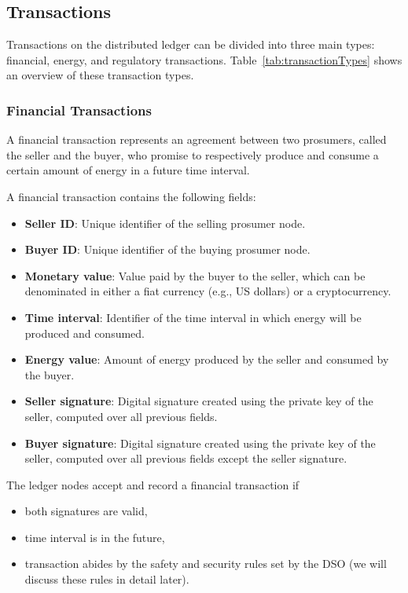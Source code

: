 \documentclass[sigconf]{acmart}
\begin{document}
\subsection{Transactions}

Transactions on the distributed ledger can be divided into three main types: financial, energy, and regulatory transactions.
Table~\ref{tab:transactionTypes} shows an overview of these transaction types.

\subsubsection{Financial Transactions}
A financial transaction represents an agreement between two prosumers, called the seller and the buyer, who promise to respectively produce and consume a certain amount of energy in a future time interval.

A financial transaction contains the following fields:
\begin{itemize}
\item \textbf{Seller ID}: Unique identifier of the selling prosumer node.
\item \textbf{Buyer ID}: Unique identifier of the buying prosumer node.
\item \textbf{Monetary value}: Value paid by the buyer to the seller, which can be denominated in either a fiat currency (e.g., US dollars) or a cryptocurrency.
\item \textbf{Time interval}: Identifier of the time interval in which energy will be produced and consumed.
\item \textbf{Energy value}: Amount of energy produced by the seller and consumed by the buyer.
\item \textbf{Seller signature}: Digital signature created using the private key of the seller, computed over all previous fields.
\item \textbf{Buyer signature}: Digital signature created using the private key of the seller, computed over all previous fields except the seller signature.
\end{itemize}

The ledger nodes accept and record a financial transaction if
\begin{itemize}
\item both signatures are valid,
\item time interval is in the future,
\item transaction abides by the safety and security rules set by the DSO (we will discuss these rules in detail later).
\end{itemize}
\end{document}
